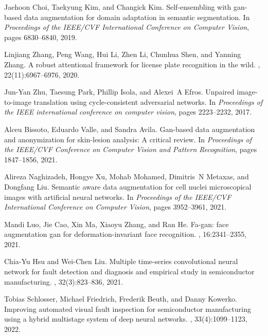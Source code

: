 \documentclass[sn-mathphys]{sn-jnl}%
\theoremstyle{thmstyleone}%
\theoremstyle{thmstyletwo}%
\theoremstyle{thmstylethree}%
\begin{document}
\begin{thebibliography}{10}
Jaehoon Choi, Taekyung Kim, and Changick Kim.
\newblock Self-ensembling with gan-based data augmentation for domain
  adaptation in semantic segmentation.
\newblock In {\em Proceedings of the IEEE/CVF International Conference on
  Computer Vision}, pages 6830--6840, 2019.

Linjiang Zhang, Peng Wang, Hui Li, Zhen Li, Chunhua Shen, and Yanning Zhang.
\newblock A robust attentional framework for license plate recognition in the
  wild.
,
  22(11):6967--6976, 2020.

Jun-Yan Zhu, Taesung Park, Phillip Isola, and Alexei~A Efros.
\newblock Unpaired image-to-image translation using cycle-consistent
  adversarial networks.
\newblock In {\em Proceedings of the IEEE international conference on computer
  vision}, pages 2223--2232, 2017.

Alceu Bissoto, Eduardo Valle, and Sandra Avila.
\newblock Gan-based data augmentation and anonymization for skin-lesion
  analysis: A critical review.
\newblock In {\em Proceedings of the IEEE/CVF Conference on Computer Vision and
  Pattern Recognition}, pages 1847--1856, 2021.

Alireza Naghizadeh, Hongye Xu, Mohab Mohamed, Dimitris~N Metaxas, and Dongfang
  Liu.
\newblock Semantic aware data augmentation for cell nuclei microscopical images
  with artificial neural networks.
\newblock In {\em Proceedings of the IEEE/CVF International Conference on
  Computer Vision}, pages 3952--3961, 2021.

Mandi Luo, Jie Cao, Xin Ma, Xiaoyu Zhang, and Ran He.
\newblock Fa-gan: face augmentation gan for deformation-invariant face
  recognition.
,
  16:2341--2355, 2021.

Chia-Yu Hsu and Wei-Chen Liu.
\newblock Multiple time-series convolutional neural network for fault detection
  and diagnosis and empirical study in semiconductor manufacturing.
, 32(3):823--836, 2021.

Tobias Schlosser, Michael Friedrich, Frederik Beuth, and Danny Kowerko.
\newblock Improving automated visual fault inspection for semiconductor
  manufacturing using a hybrid multistage system of deep neural networks.
, 33(4):1099--1123, 2022.


\end{thebibliography}
\end{document}
